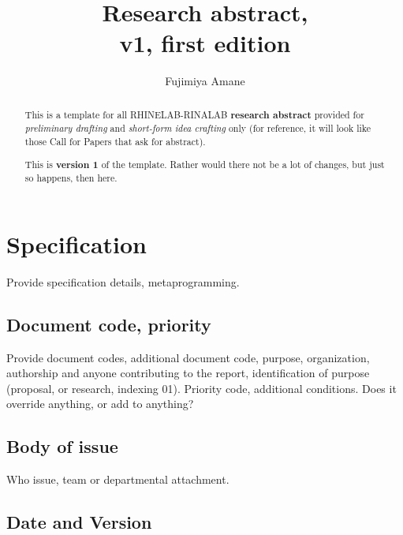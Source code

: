 \documentclass[10pt,a4paper]{article}
\title{\textbf{Research abstract},\\ v1, first edition} %
\author{Fujimiya Amane} %
\affiliation{} %
\begin{document}
\maketitle

\begin{abstract}
    \noindent
    This is a template for all RHINELAB-RINALAB \textbf{research abstract} provided for \textit{preliminary drafting} and \textit{short-form idea crafting} only (for reference, it will look like those Call for Papers that ask for abstract). 
    
    This is \textbf{version 1} of the template. Rather would there not be a lot of changes, but just so happens, then here. 

\end{abstract}

\vspace{2.5cm}



\thispagestyle{firstpage}

\pagebreak


\newgeometry{} %

\section{Specification}
\label{sec:spec}

Provide specification details, metaprogramming. 

\subsection{Document code, priority}

Provide document codes, additional document code, purpose, organization, authorship and anyone contributing to the report, identification of purpose (proposal, or research, indexing 01). Priority code, additional conditions. Does it override anything, or add to anything?

\subsection{Body of issue}

Who issue, team or departmental attachment. 

\subsection{Date and Version}
\end{document}
